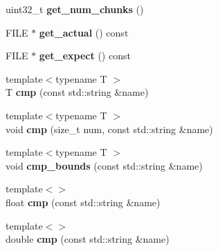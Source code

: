\begin{DoxyCompactItemize}
\item 
\hypertarget{classcomparer__context_afe13fe6c0653ee2e3d76d790b69d5e15}{uint32\+\_\+t {\bfseries get\+\_\+num\+\_\+chunks} ()}\label{classcomparer__context_afe13fe6c0653ee2e3d76d790b69d5e15}

\item 
\hypertarget{classcomparer__context_aa38b7adda0f03951648387420320533e}{F\+I\+L\+E $\ast$ {\bfseries get\+\_\+actual} () const }\label{classcomparer__context_aa38b7adda0f03951648387420320533e}

\item 
\hypertarget{classcomparer__context_add19ca61f4a7939eb9cfe637f4323c25}{F\+I\+L\+E $\ast$ {\bfseries get\+\_\+expect} () const }\label{classcomparer__context_add19ca61f4a7939eb9cfe637f4323c25}

\item 
\hypertarget{classcomparer__context_a6b58abc0d8e925b0168f6e08a67f1f05}{{\footnotesize template$<$typename T $>$ }\\T {\bfseries cmp} (const std\+::string \&name)}\label{classcomparer__context_a6b58abc0d8e925b0168f6e08a67f1f05}

\item 
\hypertarget{classcomparer__context_a74f91053a0bd36ed787c735938b77757}{{\footnotesize template$<$typename T $>$ }\\void {\bfseries cmp} (size\+\_\+t num, const std\+::string \&name)}\label{classcomparer__context_a74f91053a0bd36ed787c735938b77757}

\item 
\hypertarget{classcomparer__context_a21034f3231887cdd20aa3f510ffd5cdc}{{\footnotesize template$<$typename T $>$ }\\void {\bfseries cmp\+\_\+bounds} (const std\+::string \&name)}\label{classcomparer__context_a21034f3231887cdd20aa3f510ffd5cdc}

\item 
\hypertarget{classcomparer__context_a6feaf6af67dbdf1254d2b5d1c94087af}{{\footnotesize template$<$$>$ }\\float {\bfseries cmp} (const std\+::string \&name)}\label{classcomparer__context_a6feaf6af67dbdf1254d2b5d1c94087af}

\item 
\hypertarget{classcomparer__context_a04a7de01931dabb9806710368251adf7}{{\footnotesize template$<$$>$ }\\double {\bfseries cmp} (const std\+::string \&name)}\label{classcomparer__context_a04a7de01931dabb9806710368251adf7}


\end{DoxyCompactItemize}

